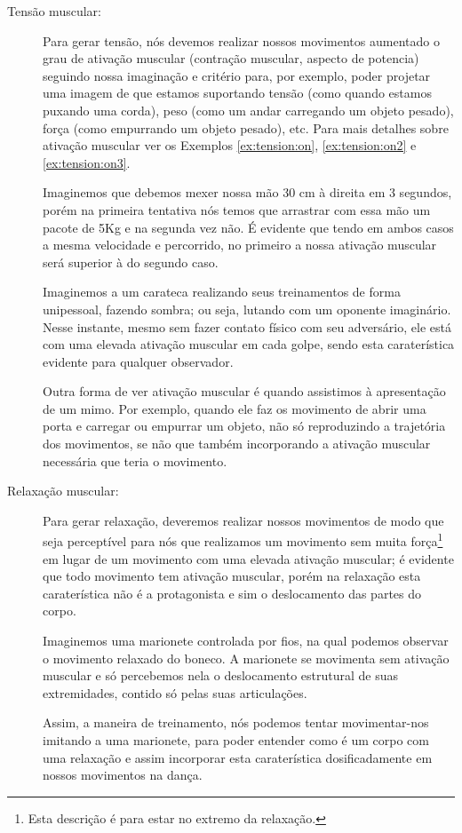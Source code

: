 \begin{description}
\item[Tensão muscular:] Para gerar tensão, 
nós devemos realizar nossos movimentos aumentado o grau de ativação muscular 
(contração muscular, aspecto de potencia) 
seguindo nossa imaginação e critério 
para, por exemplo, poder projetar uma imagem de que estamos suportando tensão (como quando estamos puxando uma corda), 
peso (como um andar carregando um objeto pesado), força (como empurrando um objeto pesado), etc.
Para mais detalhes sobre ativação muscular ver os Exemplos \ref{ex:tension:on}, \ref{ex:tension:on2} e \ref{ex:tension:on3}.
\begin{example}
\label{ex:tension:on}
Imaginemos que debemos mexer nossa mão 30 cm à direita em 3 segundos,
porém na primeira tentativa nós temos que arrastrar com essa mão um pacote de 5Kg
e na segunda vez não.
É evidente que tendo em ambos casos a mesma velocidade e percorrido,
no primeiro a nossa ativação muscular será superior à do segundo caso.
\end{example}
\begin{example}
\label{ex:tension:on2}
Imaginemos a um carateca realizando seus treinamentos de forma unipessoal, 
fazendo sombra; ou seja, lutando com um oponente imaginário.
Nesse instante, mesmo sem fazer contato físico com seu adversário,
ele está com uma elevada ativação muscular em cada golpe,
sendo esta caraterística evidente para qualquer observador.
\end{example}
\begin{example}
\label{ex:tension:on3}
Outra forma de ver ativação muscular é quando assistimos à apresentação de um mimo.
Por exemplo, quando ele faz os movimento de  abrir uma porta e carregar ou empurrar um objeto,
não só reproduzindo a trajetória dos movimentos, 
se não que também incorporando a ativação muscular necessária que teria o movimento. 
\end{example}
\item[Relaxação muscular:] Para gerar relaxação, 
deveremos realizar nossos movimentos 
de modo que seja perceptível para nós que realizamos um movimento sem muita força\footnote{Esta
descrição é para estar no extremo da relaxação.} em lugar de 
um movimento com uma elevada ativação muscular;
é evidente que todo movimento tem ativação muscular,
porém na relaxação esta caraterística não é a protagonista 
e sim o deslocamento das partes do corpo.
\begin{example}
Imaginemos uma marionete controlada por fios, 
na qual podemos observar o movimento relaxado do boneco.
A marionete se movimenta sem ativação muscular 
e só percebemos nela o deslocamento estrutural de suas extremidades, 
contido só pelas suas articulações.

Assim, a maneira de treinamento, 
nós podemos tentar movimentar-nos imitando a uma marionete, 
para poder entender como é um corpo com uma relaxação 
e assim incorporar esta caraterística dosificadamente em nossos movimentos na dança.
\end{example} 
\end{description}

